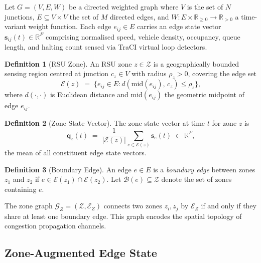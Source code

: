 \documentclass[journal,letterpaper,10pt]{IEEEtran}
\theoremstyle{definition}
\newtheorem{definition}{Definition}
\theoremstyle{remark}
\newcommand{\R}{\mathbb{R}}
\newcommand{\zones}{\mathcal{Z}}
\newcommand{\zstate}{\mathbf{q}}
\begin{document}
Let $G=(V,E,W)$ be a directed weighted graph where $V$ is the set of
$N$ junctions, $E\subseteq V\!\times\!V$ the set of $M$ directed
edges, and $W:E\times\R_{\geq0}\to\R_{>0}$ a time-variant weight
function.  Each edge $e_{ij}\in E$ carries an edge state vector
$\mathbf{s}_{ij}(t)\in\R^{F}$ comprising normalised speed, vehicle
density, occupancy, queue length, and halting count sensed via TraCI
virtual loop detectors.

\begin{definition}[RSU Zone]
\label{def:zone}
An RSU zone $z\in\zones$ is a geographically bounded sensing region
centred at junction $c_z\in V$ with radius $\rho_z>0$, covering the
edge set
\begin{equation}
  \mathcal{E}(z)
  \;=\;
  \bigl\{e_{ij}\in E :
    d\!\left(\mathrm{mid}(e_{ij}),\,c_z\right)\leq\rho_z
  \bigr\},
  \label{eq:zone_edges}
\end{equation}
where $d(\cdot,\cdot)$ is Euclidean distance and
$\mathrm{mid}(e_{ij})$ the geometric midpoint of edge $e_{ij}$.
\end{definition}

\begin{definition}[Zone State Vector]
\label{def:zstate}
The zone state vector at time $t$ for zone $z$ is
\begin{equation}
  \zstate_z(t)
  \;=\;
  \frac{1}{|\mathcal{E}(z)|}
  \sum_{e\in\mathcal{E}(z)}
  \mathbf{s}_{e}(t)
  \;\in\;\R^{F},
  \label{eq:zone_state}
\end{equation}
the mean of all constituent edge state vectors.
\end{definition}

\begin{definition}[Boundary Edge]
\label{def:boundary}
An edge $e\in E$ is a \emph{boundary edge} between zones $z_1$ and
$z_2$ if $e\in\mathcal{E}(z_1)\cap\mathcal{E}(z_2)$.  Let
$\mathcal{B}(e)\subseteq\zones$ denote the set of zones containing
$e$.
\end{definition}

The zone graph $\mathcal{G}_Z=(\zones,\mathcal{E}_Z)$ connects two
zones $z_i,z_j$ by $\mathcal{E}_Z$ if and only if they share at
least one boundary edge.  This graph encodes the spatial topology of
congestion propagation channels.

\subsection{Zone-Augmented Edge State}
\label{sec:augstate}
\end{document}
